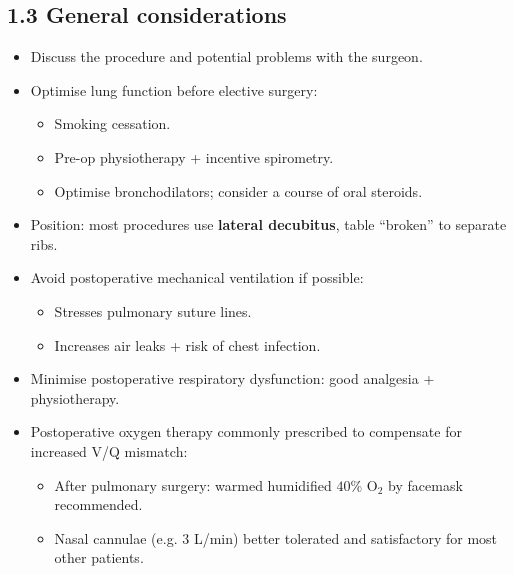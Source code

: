 \documentclass[11pt,a4paper]{article}
\begin{document}
\subsection{1.3 General considerations}
\begin{itemize}[leftmargin=*, itemsep=2pt]
  \item Discuss the procedure and potential problems with the surgeon.
  \item Optimise lung function before elective surgery:
  \begin{itemize}[leftmargin=*, itemsep=2pt]
    \item Smoking cessation.
    \item Pre-op physiotherapy + incentive spirometry.
    \item Optimise bronchodilators; consider a course of oral steroids.
  \end{itemize}
  \item Position: most procedures use \textbf{lateral decubitus}, table ``broken'' to separate ribs.
  \item Avoid postoperative mechanical ventilation if possible:
  \begin{itemize}[leftmargin=*, itemsep=2pt]
    \item Stresses pulmonary suture lines.
    \item Increases air leaks + risk of chest infection.
  \end{itemize}
  \item Minimise postoperative respiratory dysfunction: good analgesia + physiotherapy.
  \item Postoperative oxygen therapy commonly prescribed to compensate for increased V/Q mismatch:
  \begin{itemize}[leftmargin=*, itemsep=2pt]
    \item After pulmonary surgery: warmed humidified \(40\%\) \(\mathrm{O_2}\) by facemask recommended.
    \item Nasal cannulae (e.g. 3 L/min) better tolerated and satisfactory for most other patients.
  \end{itemize}
\end{itemize}
\end{document}
